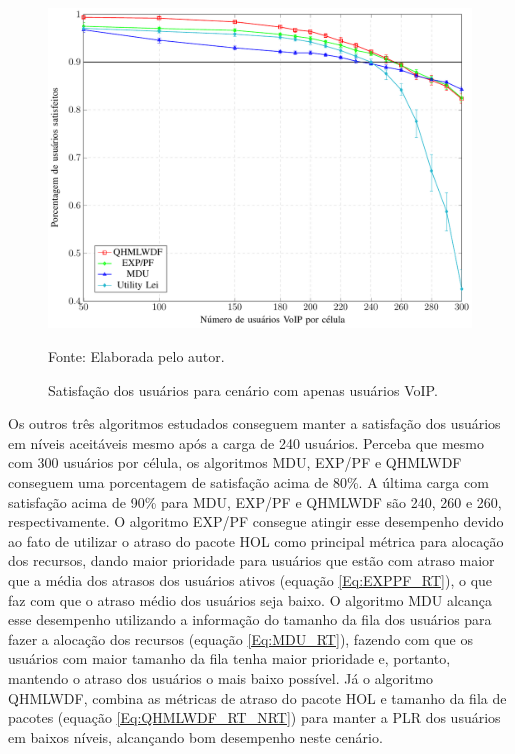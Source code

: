 \begin{figure}[htb]
	\centering	
	
	\caption[Satisfação dos usuários para cenário com apenas usuários VoIP]{Satisfação dos usuários para cenário com apenas usuários VoIP.}
	\includegraphics[width=1\textwidth]{figs/VOIPAll.pdf}
	
	{Fonte: Elaborada pelo autor.}
	\label{fig:VoIPAll}
\end{figure}

Os outros três algoritmos estudados conseguem manter a satisfação dos usuários em níveis aceitáveis mesmo após a carga de 240 usuários. Perceba que mesmo com 300 usuários por célula, os algoritmos MDU, EXP/PF e QHMLWDF conseguem uma porcentagem de satisfação acima de 80\%. A última carga com satisfação acima de 90\% para MDU, EXP/PF e QHMLWDF são 240, 260 e 260, respectivamente. O algoritmo EXP/PF consegue atingir esse desempenho devido ao fato de utilizar o atraso do pacote HOL como principal métrica para alocação dos recursos, dando maior prioridade para usuários que estão com atraso maior que a média dos atrasos dos usuários ativos (equação \ref{Eq:EXPPF_RT}), o que faz com que o atraso médio dos usuários seja baixo. O algoritmo MDU alcança esse desempenho utilizando a informação do tamanho da fila dos usuários para fazer a alocação dos recursos (equação \ref{Eq:MDU_RT}), fazendo com que os usuários com maior tamanho da fila tenha maior prioridade e, portanto, mantendo o atraso dos usuários o mais baixo possível. Já o algoritmo QHMLWDF, combina as métricas de atraso do pacote HOL e tamanho da fila de pacotes (equação \ref{Eq:QHMLWDF_RT_NRT}) para manter a PLR dos usuários em baixos níveis,  alcançando bom desempenho neste cenário. 

